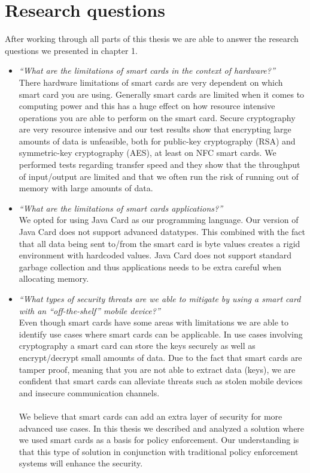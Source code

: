 \section{Research questions}
After working through all parts of this thesis we are able to answer the research questions we presented in chapter 1.
\begin{itemize}
  \item \textit{``What are the limitations of smart cards in the context of hardware?''}\\
  There hardware limitations of smart cards are very dependent on which smart card you are using. Generally smart cards are limited when it comes to computing power and this has a huge effect on how resource intensive operations you are able to perform on the smart card. Secure cryptography are very resource intensive and our test results show that encrypting large amounts of data is unfeasible, both for public-key cryptography (RSA) and symmetric-key cryptography (AES), at least on NFC smart cards. We performed tests regarding transfer speed and they show that the throughput of input/output are limited and that we often run the risk of running out of memory with large amounts of data.
  \item \textit{``What are the limitations of smart cards applications?''}\\
  We opted for using Java Card as our programming language. Our version of Java Card does not support advanced datatypes. This combined with the fact that all data being sent to/from the smart card is byte values creates a rigid environment with hardcoded values. Java Card does not support standard garbage collection and thus applications needs to be extra careful when allocating memory.
  \item \textit{``What types of security threats are we able to mitigate by using a smart card with an ``off-the-shelf'' mobile device?''}\\
  Even though smart cards have some areas with limitations we are able to identify use cases where smart cards can be applicable. In use cases involving cryptography a smart card can store the keys securely as well as encrypt/decrypt small amounts of data. Due to the fact that smart cards are tamper proof, meaning that you are not able to extract data (keys), we are confident that smart cards can alleviate threats such as stolen mobile devices and insecure communication channels.\mbox{}\\\\  We believe that smart cards can add an extra layer of security for more advanced use cases. In this thesis we described and analyzed a solution where we used smart cards as a basis for policy enforcement. Our understanding is that this type of solution in conjunction with traditional policy enforcement systems will enhance the security.
\end{itemize}

